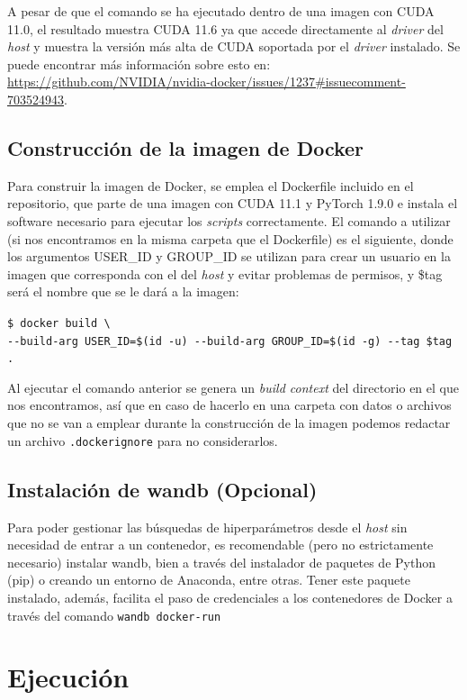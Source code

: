A pesar de que el comando se ha ejecutado dentro de una imagen con CUDA 11.0, el resultado muestra CUDA 11.6 ya que accede directamente al \textit{driver} del \textit{host} y muestra la versión más alta de CUDA soportada por el \textit{driver} instalado. Se puede encontrar más información sobre esto en: \url{https://github.com/NVIDIA/nvidia-docker/issues/1237#issuecomment-703524943}.

\subsection{Construcción de la imagen de Docker}

Para construir la imagen de Docker, se emplea el Dockerfile incluido en el repositorio, que parte de una imagen con CUDA 11.1 y PyTorch 1.9.0 e instala el software necesario para ejecutar los \textit{scripts} correctamente. El comando a utilizar (si nos encontramos en la misma carpeta que el Dockerfile) es el siguiente, donde los argumentos USER{\_}ID y GROUP{\_}ID se utilizan para crear un usuario en la imagen que corresponda con el del \textit{host} y evitar problemas de permisos, y \$tag será el nombre que se le dará a la imagen:

\texttt{\$ docker build \textbackslash \\
{-}{-}build{-}arg USER{\_}ID=\$(id {-}u) {-}{-}build{-}arg GROUP{\_}ID=\$(id {-}g) {-}{-}tag \$tag .}

Al ejecutar el comando anterior se genera un \textit{build context} del directorio en el que nos encontramos, así que en caso de hacerlo en una carpeta con datos o archivos que no se van a emplear durante la construcción de la imagen podemos redactar un archivo \texttt{.dockerignore} para no considerarlos.

\subsection{Instalación de wandb (Opcional)}

Para poder gestionar las búsquedas de hiperparámetros desde el \textit{host} sin necesidad de entrar a un contenedor, es recomendable (pero no estrictamente necesario) instalar wandb, bien a través del instalador de paquetes de Python (pip) o creando un entorno de Anaconda, entre otras. Tener este paquete instalado, además, facilita el paso de credenciales a los contenedores de Docker a través del comando \texttt{wandb docker{-}run}

\section{Ejecución}

